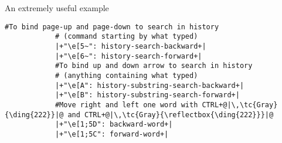 \begin{frame}[fragile]{An extremely useful example}
\begin{onlyenv}
\begin{lstlisting}[style=myBash, numbers=none, commentstyle=\color{Gray}]
            #To bind page-up and page-down to search in history
            # (command starting by what typed)
            |+"\e[5~": history-search-backward+|
            |+"\e[6~": history-search-forward+|
            #To bind up and down arrow to search in history
            # (anything containing what typed)
            |+"\e[A": history-substring-search-backward+|
            |+"\e[B": history-substring-search-forward+|
            #Move right and left one word with CTRL+@|\,\tc{Gray}{\ding{222}}|@ and CTRL+@|\,\tc{Gray}{\reflectbox{\ding{222}}}|@
            |+"\e[1;5D": backward-word+|
            |+"\e[1;5C": forward-word+|
        \end{lstlisting}
    \end{onlyenv}
\end{frame}
